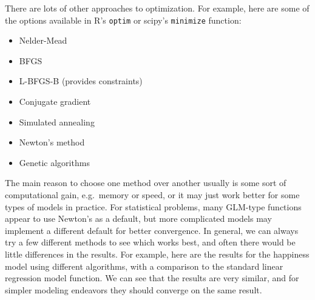 \documentclass[
  letterpaper,
]{krantz}
\providecommand{\tightlist}{%
  \setlength{\itemsep}{0pt}\setlength{\parskip}{0pt}}\usepackage{longtable,booktabs,array}
\begin{document}
There are lots of other approaches to optimization. For example, here
are some of the options available in R's \texttt{optim} or scipy's
\texttt{minimize} function:

\begin{itemize}
\tightlist
\item
  Nelder-Mead
\item
  BFGS
\item
  L-BFGS-B (provides constraints)
\item
  Conjugate gradient
\item
  Simulated annealing
\item
  Newton's method
\item
  Genetic algorithms
\end{itemize}

The main reason to choose one method over another usually is some sort
of computational gain, e.g.~memory or speed, or it may just work better
for some types of models in practice. For statistical problems, many
GLM-type functions appear to use Newton's as a default, but more
complicated models may implement a different default for better
convergence. In general, we can always try a few different methods to
see which works best, and often there would be little differences in the
results. For example, here are the results for the happiness model using
different algorithms, with a comparison to the standard linear
regression model function. We can see that the results are very similar,
and for simpler modeling endeavors they should converge on the same
result.

\setlength{\LTpost}{0mm}
\end{document}
